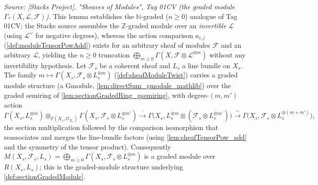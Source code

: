 \begin{lemma}\leanok
  \label{lem:sectionGradedModule_gmodule}
  \textit{Source: [Stacks Project], "Sheaves of Modules", Tag 01CV (the graded
  module \(\Gamma_*(X,\mathcal{L},\mathcal{F})\)).}
  This lemma establishes the \(\mathbb{N}\)-graded (\(n\ge 0\)) analogue of Tag 01CV: the
  Stacks source assembles the \(\mathbb{Z}\)-graded module over an \emph{invertible}
  \(\mathcal{L}\) (using \(\mathcal{L}^\vee\) for negative degrees), whereas the
  action comparison \(a_{i,j}\) (\cref{def:moduleTensorPowAdd}) exists for an
  arbitrary sheaf of modules \(\mathcal{F}\) and an arbitrary \(\mathcal{L}\), yielding
  the \(n\ge 0\) truncation \(\bigoplus_{m\ge 0}\Gamma(X,\mathcal{F}\otimes
  \mathcal{L}^{\otimes m})\) without any invertibility hypothesis.
  Let \(\mathcal{F}_s\) be a coherent sheaf and \(L_s\) a line bundle on
  \(X_s\). The family
  \(m \mapsto \Gamma(X_s, \mathcal{F}_s \otimes L_s^{\otimes m})\)
  (\cref{def:sheafModuleTwist}) carries a graded module structure (a
  \(\mathrm{Gmodule}\), \cref{lem:directSum_gmodule_mathlib}) over the graded
  semiring of \cref{lem:sectionGradedRing_gsemiring}, with degree-\((m,m')\)
  action
  \[
    \Gamma(X_s, L_s^{\otimes m}) \otimes_{\Gamma(X_s,\mathcal{O}_{X_s})}
      \Gamma(X_s, \mathcal{F}_s \otimes L_s^{\otimes m'})
    \xrightarrow{\ \cdot\ }
    \Gamma\bigl(X_s, L_s^{\otimes m} \otimes
      (\mathcal{F}_s \otimes L_s^{\otimes m'})\bigr)
    \xrightarrow{\ \sim\ }
    \Gamma\bigl(X_s, \mathcal{F}_s \otimes L_s^{\otimes (m+m')}\bigr),
  \]
  the section multiplication followed by the comparison isomorphism that
  reassociates and merges the line-bundle factors (using
  \cref{lem:sheafTensorPow_add} and the symmetry of the tensor product).
  Consequently \(M(X_s, \mathcal{F}_s, L_s) = \bigoplus_{m \ge 0}
  \Gamma(X_s, \mathcal{F}_s \otimes L_s^{\otimes m})\) is a graded module over
  \(R(X_s, L_s)\); this is the graded-module structure underlying
  \cref{def:sectionGradedModule}.
\end{lemma}

